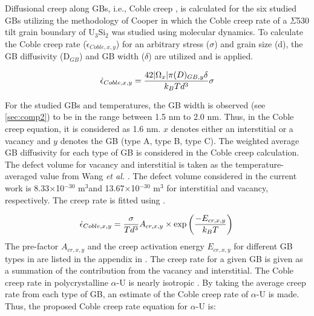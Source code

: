 \documentclass[review]{elsarticle}
\begin{document}
\par Diffusional creep along GBs, i.e., Coble creep \cite{coble}, is calculated for the six studied GBs utilizing the methodology of Cooper \cite{USi_diffusion} in which the Coble creep rate of a $\Sigma$530 tilt grain boundary of U$_\mathrm{3}$Si$_\mathrm{2}$ was studied using molecular dynamics. To calculate the Coble creep rate ($\dot{\epsilon}_{Coble,x,y}$) for an arbitrary stress ($\sigma$) and grain size (d), the GB diffusivity (D$_{GB}$) and GB width ($\delta$) are utilized and  is applied. 

\begin{equation}
\label{eq:coble}
\dot{\epsilon}_{Coble,x,y} =\frac{42 |\ohm_{x}| \pi (D )_{GB,y} \delta}{k_{B} T d^{3}} \sigma \\
\end{equation}

\noindent For the studied GBs and temperatures, the GB width is observed (see \cref{sec:comp2}) to be in the range between 1.5 nm to 2.0 nm. Thus, in the Coble creep equation, it is considered as 1.6 nm. $x$ denotes either an interstitial or a vacancy and $y$ denotes the GB (type A, type B, type C). The weighted average GB diffusivity for each type of GB is considered in the Coble creep calculation. The defect volume for vacancy and interstitial is taken as the temperature-averaged value from Wang \textit{et al.} \cite{WANG2023154289}. The defect volume considered in the current work is 8.33$\times$10$^{-30}$ m$^\mathrm{3}$and 13.67$\times$10$^{-30}$ m$^\mathrm{3}$ for interstitial and vacancy, respectively. The creep rate is fitted using  \cite{USi_diffusion}. 
 
\begin{equation}
\label{eq:coble1}
\dot{\epsilon}_{Coble,x,y} =\frac{\sigma}{ T d^{3}} A_{cr,x,y} \times \exp\left(\frac{-E_{cr,x,y}}{k_{B} T}\right)\\
\end{equation}
% 
The pre-factor $A_{cr,x,y}$ and the creep activation energy $E_{cr,x,y}$ for different GB types in  are listed in the appendix in . The creep rate for a given GB is given as a summation of the contribution from the vacancy and interstitial. The Coble creep rate in polycrystalline $\alpha$-U is nearly isotropic \cite{calhoun}. By taking the average creep rate from each type of GB, an estimate of the Coble creep rate of $\alpha$-U is made. Thus, the proposed Coble creep rate equation for $\alpha$-U is:
\end{document}
